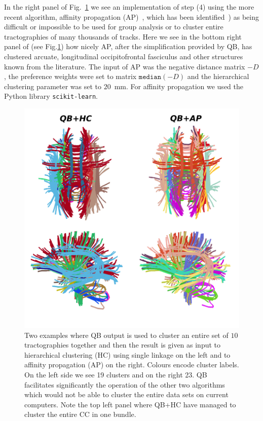 \documentclass[preprint,authoryear,a4paper,10pt,onecolumn]{elsarticle}
\begin{document}
In the right panel of Fig.~\ref{Flo:LSC+HC+AP} we see an implementation
of step (4) using the more recent algorithm, affinity propagation
(AP)~\citep{dueck2009affinity}, which has been
identified~\citep{malcolm2009filtered}) as being difficult or impossible
to be used for group analysis or to cluster entire tractographies of
many thousands of tracks.
Here we see in the bottom right panel of (see Fig.\ref{Flo:LSC+HC+AP})
how nicely AP, after the simplification provided by QB, has clustered
arcuate, longitudinal occipitofrontal fasciculus and other structures
known from the literature. The input of AP was the negative distance
matrix $-D$, the preference weights were set to matrix $\mathtt{median}(-D)$
and the hierarchical clustering parameter was set to $20$~mm.
For affinity propagation we used the Python library \texttt{scikit-learn}.

\begin{figure}
\begin{centering}
\includegraphics[scale=0.7]{Fig_8_QB_with_others}
\par\end{centering}
\caption{Two examples where QB output is used to cluster an entire set
  of $10$ tractographies together and then the result is given as input
  to hierarchical clustering (HC) using single linkage on the left and
  to affinity propagation (AP) on the right. Colours encode cluster
  labels. On the left side we see 19 clusters and on the right 23. QB
  facilitates significantly the operation of the other two algorithms
  which would not be able to cluster the entire data sets on current
  computers. Note the top left panel where QB+HC have managed to cluster
  the entire CC in one bundle.\label{Flo:LSC+HC+AP}}
\end{figure}
\end{document}
